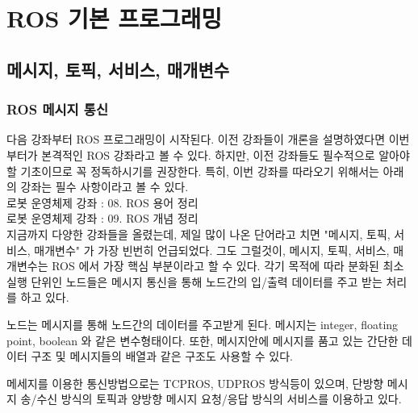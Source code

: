 
\chapter{ROS 기본 프로그래밍}
\label{cha:RosPrograming}

\section{메시지, 토픽, 서비스, 매개변수}

\subsection{ROS 메시지 통신}

다음 강좌부터 ROS 프로그래밍이 시작된다. 이전 강좌들이 개론을 설명하였다면 이번 부터가 본격적인 ROS 강좌라고 볼 수 있다. 하지만, 이전 강좌들도 필수적으로 알아야할 기초이므로 꼭 정독하시기를 권장한다. 특히, 이번 강좌를 따라오기 위해서는 아래의 강좌는 필수 사항이라고 볼 수 있다.\\

로봇 운영체제 강좌 : 08. ROS 용어 정리\\
로봇 운영체제 강좌 : 09. ROS 개념 정리\\

지금까지 다양한 강좌들을 올렸는데, 제일 많이 나온 단어라고 치면 "메시지, 토픽, 서비스, 매개변수" 가 가장 빈번히 언급되었다. 그도 그럴것이, 메시지, 토픽, 서비스, 매개변수는 ROS 에서 가장 핵심 부분이라고 할 수 있다. 각기 목적에 따라 분화된 최소 실행 단위인 노드들은 메시지 통신을 통해 노드간의 입/출력 데이터를 주고 받는 처리를 하고 있다.

\begin{definition*}
노드는 메시지를 통해 노드간의 데이터를 주고받게 된다. 메시지는 integer, floating point, boolean 와 같은 변수형태이다. 또한, 메시지안에 메시지를 품고 있는 간단한 데이터 구조 및 메시지들의 배열과 같은 구조도 사용할 수 있다. 

메세지를 이용한 통신방법으로는 TCPROS, UDPROS 방식등이 있으며, 단방향 메시지 송/수신 방식의 토픽과 양방향 메시지 요청/응답 방식의 서비스를 이용하고 있다.
\end{definition*}


